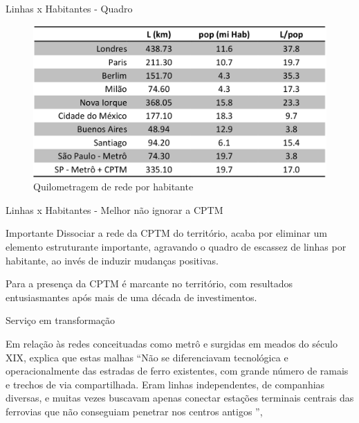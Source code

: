 \documentclass[spectratio=169, portuguese]{beamer}
\begin{document}

\begin{frame}{Linhas x Habitantes - Quadro}
	
	\begin{figure}[h]
		\caption{Quilometragem de rede por habitante 
			}
		\includegraphics[keepaspectratio,width=\textwidth]{img_isoda_km_rede.png}
	\end{figure}

\end{frame}


\begin{frame}{Linhas x Habitantes - Melhor não ignorar a CPTM}
	
	\begin{alertblock}{Importante}
		Dissociar a rede da CPTM do território, acaba por eliminar um elemento estruturante importante, agravando o quadro de escassez de linhas por habitante, ao invés de induzir mudanças positivas.
		
		Para  a presença da CPTM é marcante no território, com resultados entusiasmantes após mais de uma década de investimentos.
	\end{alertblock}

\end{frame}


\begin{frame}{Serviço em transformação}
	
	Em relação às redes conceituadas como metrô e surgidas em meados do século XIX,  explica que estas malhas ``Não se diferenciavam tecnológica e operacionalmente das estradas de ferro  existentes,  com  grande  número  de  ramais  e  trechos  de  via compartilhada. Eram linhas independentes, de companhias diversas, e muitas  vezes  buscavam  apenas  conectar  estações  terminais  centrais das ferrovias que não conseguiam penetrar nos centros antigos '', 

\end{frame}
\end{document}
